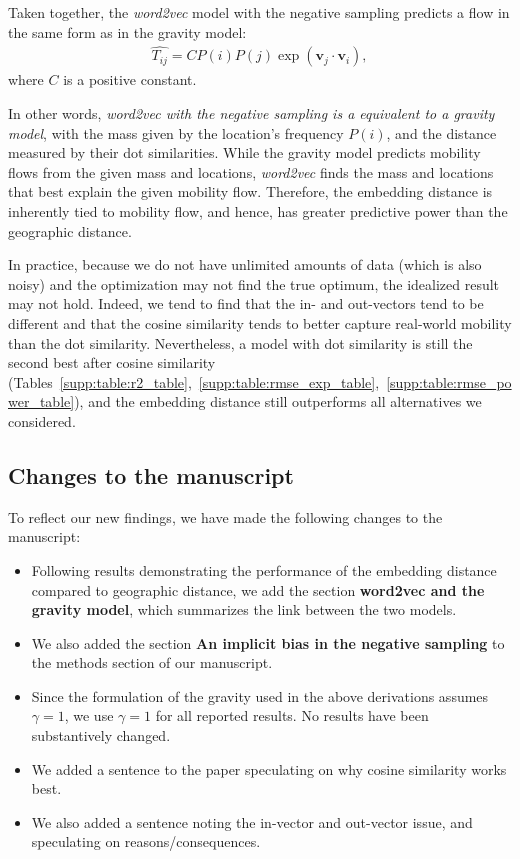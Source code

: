 \documentclass[12pt,a4paper]{article}
\begin{document}
Taken together, the {\it word2vec} model with the negative sampling predicts a flow in the same form as in the gravity model:
\begin{align}
	\hat{T_{ij}}=  C P(i) P(j)  \exp(\bm{v}_j \cdot \bm{v}_{i}), \label{eq:flow_w2v_ng0}
\end{align}
where $C$ is a positive constant.

In other words, \emph{word2vec with the negative sampling is a equivalent to a gravity model}, with the mass given by the location's frequency $P(i)$, and the distance measured by their dot similarities.
While the gravity model predicts mobility flows from the given mass and locations, {\it word2vec} finds the mass and locations that best explain the given mobility flow.
Therefore, the embedding distance is inherently tied to mobility flow, and hence, has greater predictive power than the geographic distance.

In practice, because we do not have unlimited amounts of data (which is also noisy) and the optimization may not find the true optimum, the idealized result may not hold. 
Indeed, we tend to find that the in- and out-vectors tend to be different and that the cosine similarity tends to better capture real-world mobility than the dot similarity.
Nevertheless, a model with dot similarity is still the second best after cosine similarity (Tables~\ref{supp:table:r2_table},~\ref{supp:table:rmse_exp_table},~\ref{supp:table:rmse_power_table}), and the embedding distance still outperforms all alternatives we considered. 

\subsection{Changes to the manuscript}
To reflect our new findings, we have made the following changes to the manuscript:
\begin{itemize}
	\itemsep0em
	\item Following results demonstrating the performance of the embedding distance compared to geographic distance, we add the section \textbf{word2vec and the gravity model}, which summarizes the link between the two models.
	\item We also added the section \textbf{An implicit bias in the negative sampling} to the methods section of our manuscript.
	\item Since the formulation of the gravity used in the above derivations assumes $\gamma = 1$, we use $\gamma = 1$ for all reported results. No results have been substantively changed.
	\item We added a sentence to the paper speculating on why cosine similarity works best.
	\item We also added a sentence noting the in-vector and out-vector issue, and speculating on reasons/consequences.
\end{itemize}
\end{document}
